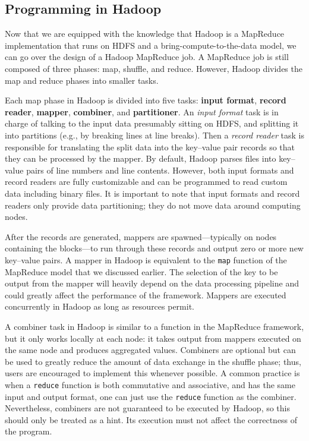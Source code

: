\documentclass[]{krantz}
\begin{document}
\subsection{Programming in Hadoop}\label{programming-in-hadoop}

Now that we are equipped with the knowledge that Hadoop is a MapReduce
implementation that runs on HDFS and a bring-compute-to-the-data model,
we can go over the design of a Hadoop MapReduce job. A MapReduce job is
still composed of three phases: map, shuffle, and reduce. However,
Hadoop divides the map and reduce phases into smaller tasks.

Each map phase in Hadoop is divided into five tasks: \textbf{input
format}, \textbf{record reader}, \textbf{mapper}, \textbf{combiner}, and
\textbf{partitioner}. An \emph{input format} task is in charge of
talking to the input data presumably sitting on HDFS, and splitting it
into partitions (e.g., by breaking lines at line breaks). Then a
\emph{record reader} task is responsible for translating the split data
into the key--value pair records so that they can be processed by the
mapper. By default, Hadoop parses files into key--value pairs of line
numbers and line contents. However, both input formats and record
readers are fully customizable and can be programmed to read custom data
including binary files. It is important to note that input formats and
record readers only provide data partitioning; they do not move data
around computing nodes.

After the records are generated, mappers are spawned---typically on
nodes containing the blocks---to run through these records and output
zero or more new key--value pairs. A mapper in Hadoop is equivalent to
the \texttt{map} function of the MapReduce model that we discussed
earlier. The selection of the key to be output from the mapper will
heavily depend on the data processing pipeline and could greatly affect
the performance of the framework. Mappers are executed concurrently in
Hadoop as long as resources permit.

A combiner task in Hadoop is similar to a function in the MapReduce
framework, but it only works locally at each node: it takes output from
mappers executed on the same node and produces aggregated values.
Combiners are optional but can be used to greatly reduce the amount of
data exchange in the shuffle phase; thus, users are encouraged to
implement this whenever possible. A common practice is when a
\texttt{reduce} function is both commutative and associative, and has
the same input and output format, one can just use the \texttt{reduce}
function as the combiner. Nevertheless, combiners are not guaranteed to
be executed by Hadoop, so this should only be treated as a hint. Its
execution must not affect the correctness of the program.
\end{document}
